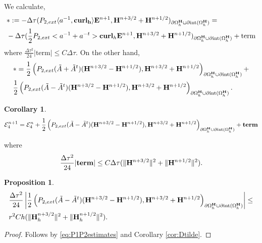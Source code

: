 \documentclass[12pt,reqno]{amsart}
\newcommand{\curl}{{\bf curl}}
\newcommand{\acurl}{\langle a^{-1},{\bf curl_h}\rangle}
\newcommand{\e}{{\bf E}}
\newcommand{\h}{{\bf H}}
\newtheorem{cor}[theorem]{Corollary}
\newtheorem{lem}[theorem]{Lemma}
\newtheorem{proposition}[theorem]{Proposition}
\theoremstyle{definition}
\numberwithin{equation}{section}
\newcommand{\intr}[1]{\mathrm{int}(#1)}
\def\Gwh{\Omega_h}
\begin{document}
We calculate,
\begin{align*}
&
*:=	-\Delta \tau( P_{2,ext}\acurl\e^{n+1},\h^{n+3/2}+\h^{n+1/2})_{\partial{\Gwh^\h}\cup \partial \intr{\Gwh^\h}}=\\&
		-\Delta \tau( \frac{1}{2}P_{2,ext}<a^{-1}+a^{-t}>\curl_h\e^{n+1},\h^{n+3/2}+\h^{n+1/2})_{\partial{\Gwh^\h}\cup \partial \intr{\Gwh^\h}}+\mathrm{term}
\end{align*}
where $\frac{\Delta \tau^2}{24}|\mathrm{term}|\leq C\Delta \tau$.
On the other hand,
\begin{align*}
	&
*=\frac{1}{2}\left( P_{2,ext}(\tilde{A}+\tilde{A}^{t})(\h^{n+3/2}-\h^{n+1/2}),
\h^{n+3/2}+\h^{n+1/2}\right)_{\partial{\Gwh^\h}\cup \partial \intr{\Gwh^\h}}+\\&
\frac{1}{2}\left( P_{2,ext}(\tilde{A}-\tilde{A}^{t})(\h^{n+3/2}-\h^{n+1/2}),
\h^{n+3/2}+\h^{n+1/2}\right)_{\partial{\Gwh^\h}\cup \partial \intr{\Gwh^\h}}.
\end{align*}
\begin{cor}
\begin{align*}
\mathcal{E}_4^{n+1}=\mathcal{E}_4^{n}+
\frac{1}{2}\left( P_{2,ext}(\tilde{A}-\tilde{A}^{t})(\h^{n+3/2}-\h^{n+1/2}),
\h^{n+3/2}+\h^{n+1/2}\right)_{\partial{\Gwh^\h}\cup \partial \intr{\Gwh^\h}}+\mathbf{term}
\end{align*}
\end{cor}
where $$\frac{\Delta \tau^2}{24}|\mathbf{term}|\leq 
C\Delta \tau(\|\h^{n+3/2}\|^2+\|\h^{n+1/2}\|^2).
$$
\begin{proposition}
	\begin{align*}
&
\frac{\Delta \tau^2}{24}\left |
\frac{1}{2}\left( P_{2,ext}(\tilde{A}-\tilde{A}^{t})(\h^{n+3/2}-\h^{n+1/2}),
\h^{n+3/2}+\h^{n+1/2}\right)_{\partial{\Gwh^\h}\cup \partial \intr{\Gwh^\h}}
\right|
\leq \\&
r^2Ch(\| \h_h^{n+3/2}\|^2+\|\h_h^{n+1/2}\|^2).
\end{align*}
\end{proposition}
\begin{proof}
Follows by \eqref{eq:P1P2estimates} and Corollary \ref{cor:Dtilde}.
\end{proof}
\end{document}

